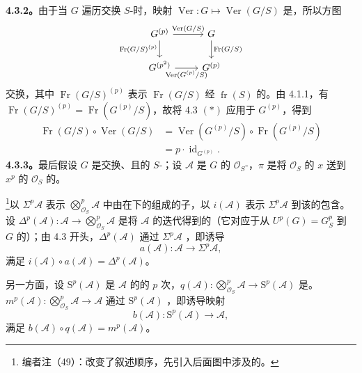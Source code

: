 \textbf{4.3.2。}由于当 $G$ 遍历交换 $S$-时，映射 $\operatorname{Ver}:G\mapsto\operatorname{Ver}(G/S)$ 是，所以方图
\[
\begin{tikzcd}
G^{(p)}\arrow[r,"\operatorname{Ver}(G/S)"]\arrow[d,"\operatorname{Fr}(G/S)^{(p)}"']&G\arrow[d,"\operatorname{Fr}(G/S)"]\\
G^{(p^2)}\arrow[r,"\operatorname{Ver}(G^{(p)}/S)"']&G^{(p)}
\end{tikzcd}
\]
交换，其中 $\operatorname{Fr}(G/S)^{(p)}$ 表示 $\operatorname{Fr}(G/S)$ 经 $\operatorname{fr}(S)$ 的。由 4.1.1，有 $\operatorname{Fr}(G/S)^{(p)}=\operatorname{Fr}(G^{(p)}/S)$，故将 4.3 $(*)$ 应用于 $G^{(p)}$，得到
\[
\begin{aligned}
\operatorname{Fr}(G/S)\circ\operatorname{Ver}(G/S)
&=\operatorname{Ver}(G^{(p)}/S)\circ\operatorname{Fr}(G^{(p)}/S)\\
&=p\cdot\operatorname{id}_{G^{(p)}}.
\end{aligned}\tag{$**$}
\]
\textbf{4.3.3。}最后假设 $G$ 是交换、且的 $S$-；设 $\mathcal A$ 是 $G$ 的 $\mathcal O_S$-，$\pi$ 是将 $\mathcal O_S$ 的 $x$ 送到 $x^p$ 的 $\mathcal O_S$ 的。

\footnote{编者注（49）：改变了叙述顺序，先引入后面图中涉及的。}以 $\Sigma^p\mathcal A$ 表示 $\bigotimes_{\mathcal O_S}^p\mathcal A$ 中由在下的组成的子，以 $i(\mathcal A)$ 表示 $\Sigma^p\mathcal A$ 到该的包含。设 $\Delta^p(\mathcal A):\mathcal A\to\bigotimes_{\mathcal O_S}^p\mathcal A$ 是将 $\mathcal A$ 的迭代得到的（它对应于从 $U^p(G)=G_S^p$ 到 $G$ 的）；由 4.3 开头，$\Delta^p(\mathcal A)$ 通过 $\Sigma^p\mathcal A$ ，即诱导
\[
a(\mathcal A):\mathcal A\longrightarrow\Sigma^p\mathcal A,
\]
满足 $i(\mathcal A)\circ a(\mathcal A)=\Delta^p(\mathcal A)$。

另一方面，设 $\mathrm S^p(\mathcal A)$ 是 $\mathcal A$ 的的 $p$ 次，$q(\mathcal A):\bigotimes_{\mathcal O_S}^p\mathcal A\to\mathrm S^p(\mathcal A)$ 是。 $m^p(\mathcal A):\bigotimes_{\mathcal O_S}^p\mathcal A\to\mathcal A$ 通过 $\mathrm S^p(\mathcal A)$ ，即诱导映射
\[
b(\mathcal A):\mathrm S^p(\mathcal A)\longrightarrow\mathcal A,
\]
满足 $b(\mathcal A)\circ q(\mathcal A)=m^p(\mathcal A)$。

